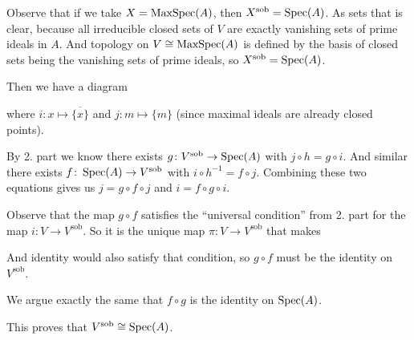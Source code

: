 \begin{exercise}{4}
\begin{enumerate}
{            Observe that if we take $X = \operatorname{MaxSpec}(A)$, then $X^{\text{sob}} =
            \operatorname{Spec}(A)$. As sets that is clear, because all irreducible closed
            sets of $V$ are exactly vanishing sets of prime ideals in $A$. And
            topology on $V \cong \operatorname{MaxSpec}(A)$ is defined by the basis of closed
            sets being the vanishing sets of prime ideals, so $X^{\text{sob}} =
            \operatorname{Spec}(A)$.

            Then we have a diagram


            where $i \colon x \mapsto \overline{\{x\}}$ and $j \colon m \mapsto
            \{m\}$ (since maximal ideals are already closed points).

            By 2. part we know there exists $g \colon V^{\text{sob}} \rightarrow
            \operatorname{Spec}(A)$ with $j \circ h = g \circ i$. And similar there exists $f
            \colon \operatorname{Spec}(A) \rightarrow V^{\text{sob}}$ with $i \circ h^{-1} = f
            \circ j$. Combining these two equations gives us $j = g \circ f
            \circ j$ and $i = f \circ g \circ i$.

            Observe that the map $g \circ f$ satisfies the ``universal
            condition'' from 2. part for the map $i \colon V \rightarrow
            V^{\text{sob}}$. So it is the unique map $\pi \colon V \rightarrow
            V^{\text{sob}}$ that makes


            And identity would also satisfy that condition, so
            $g \circ f$ must be the identity on $V^{\text{sob}}$.

            We argue exactly the same that $f \circ g$ is the identity on
            $\operatorname{Spec}(A)$.

            This proves that $V^{\text{sob}} \cong \operatorname{Spec}(A)$.
            }
    \end{enumerate}
\end{exercise}


